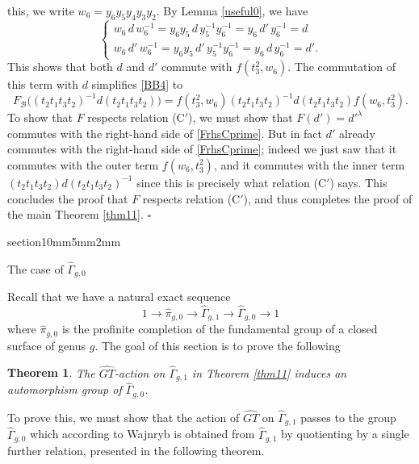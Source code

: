 \documentclass[a4paper,10pt,reqno]{amsart}
\makeatletter
\newcommand\GT{\widehat{GT}}
\newcommand\GGone{\widehat{\Gamma}_{g,1}}
\newcommand\GGzero{\widehat{\Gamma}_{g,0}}
\newtheorem{thm}{Theorem}[section]
\renewcommand{\section}{\@startsection
{section}{1}{0mm}{5mm}{2mm}{\raggedright\bfseries}}
\makeatother
\begin{document}
this, we write $w_6=y_6y_5y_4y_3y_2$. By Lemma \ref{useful0}, we have
\begin{equation*}
\begin{cases}
w_6\,d\,w_6^{-1}=y_6y_5\,d\,y_5^{-1}y_6^{-1}=y_6\,d'\,y_6^{-1}=d\\
w_6\,d'\,w_6^{-1}=y_6y_5\,d'\,y_5^{-1}y_6^{-1}=y_6\,d\,y_6^{-1}=d'.
\end{cases}
\end{equation*}
This shows that both $d$ and $d'$ commute with $f(t_3^2,w_6)$. The commutation 
of this term with $d$ simplifies \eqref{BB4} to
\begin{equation}\label{FrhsCprime}
F_{\mathcal{B}}\bigl((t_2t_1t_3t_2)^{-1}d(t_2t_1t_3t_2)\bigr)=
f(t_3^2,w_6)(t_2t_1t_3t_2)^{-1}d(t_2t_1t_3t_2)f(w_6,t_3^2).
\end{equation}
To show that $F$ respects relation (C$'$), we must show that $F(d')={d'}^\lambda$ commutes with the
right-hand side of \eqref{FrhsCprime}. But in fact $d'$ already commutes with the right-hand
side of \eqref{FrhsCprime}; indeed we just saw that it commutes with the outer term
$f(w_6,t_3^2)$, and it commutes with the inner term
$(t_2t_1t_3t_2)d(t_2t_1t_3t_2)^{-1}$ since this is precisely what relation (C$'$) says. 
This concludes the proof that $F$ respects relation (C$'$), and thus completes the 
proof of the main Theorem \ref{thm11}.
\hfill{$\square$}


\section{The case of $\GGzero$}


Recall that we have a natural 
exact sequence
$$
1\to \hat\pi_{g,0} \to \GGone \to \GGzero\to 1
$$
where $\hat\pi_{g,0}$ is the profinite completion of 
the fundamental group of a closed surface of 
genus $g$. 
The goal of this section is to prove the following 

\begin{thm} 
\label{GGzero}
The $\GT$-action on $\GGone$ in
Theorem \ref{thm11} induces an automorphism group of 
$\GGzero$.
\end{thm}

To prove this, we must show that the action of $\GT$ on $\GGone$ 
passes to the group $\GGzero$ which according to Wajnryb \cite{W} 
is obtained from $\GGone$ by 
quotienting by a single further relation, presented in the following theorem.
\end{document}

